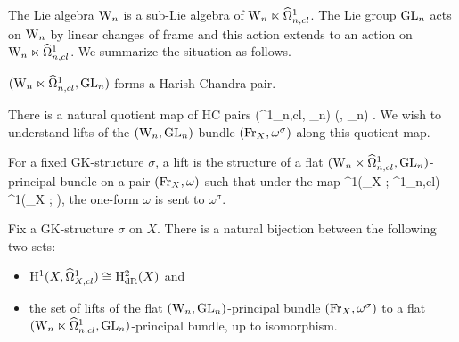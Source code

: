 The Lie algebra ${{\rm W}_n}$ is a sub-Lie algebra of ${{\rm W}_n} \ltimes
\widehat{\Omega}^1_{n,cl}$. The Lie group ${\rm GL}_n$ acts on ${{\rm W}_n}$ by linear
changes of frame and this action extends to an action on ${{\rm W}_n} \ltimes
\widehat{\Omega}^{1}_{n,cl}$. We summarize the situation as follows.

\begin{lem} 
$({{\rm W}_n} \ltimes \widehat{\Omega}^1_{n,cl}, {\rm GL}_n)$ forms a Harish-Chandra pair. 
\end{lem}
 
There is a natural quotient map of HC pairs
\ben
(\Vect \ltimes \hOmega^1_{n,cl}, \GL_n) \to (\Vect, \GL_n) .
\een 
We wish to understand lifts of the $({{\rm W}_n}, {\rm GL}_n)$-bundle $({\rm Fr}_X,
\omega^\sigma)$ along this quotient map.

For a fixed GK-structure $\sigma$, a lift is the structure of a flat $({{\rm W}_n} \ltimes
\widehat{\Omega}^1_{n,cl}, {\rm GL}_n)$-principal bundle on a pair $({\rm Fr}_X, \omega)$
such that under the map
\ben
\Omega^1(\Fr_X ; \Vect \ltimes \hOmega^1_{n,cl}) \to \Omega^1(\Fr_X ;
\Vect),
\een
the one-form $\omega$ is sent to $\omega^\sigma$. 

\begin{prop} 
Fix a GK-structure $\sigma$ on $X$. 
There is a natural bijection between the following two sets:
\begin{itemize}
\item ${\rm H}^1(X, \widehat{\Omega}^1_{X,cl}) \cong {\rm H}^2_{{\rm dR}}(X)$ and
\item the set of lifts of the flat $({{\rm W}_n}, {\rm GL}_n)$-principal bundle $({\rm Fr}_X, \omega^\sigma)$ to a flat $({{\rm W}_n} \ltimes \widehat{\Omega}^1_{n,cl}, {\rm GL}_n)$-principal bundle, up to isomorphism.
\end{itemize}
\end{prop}


